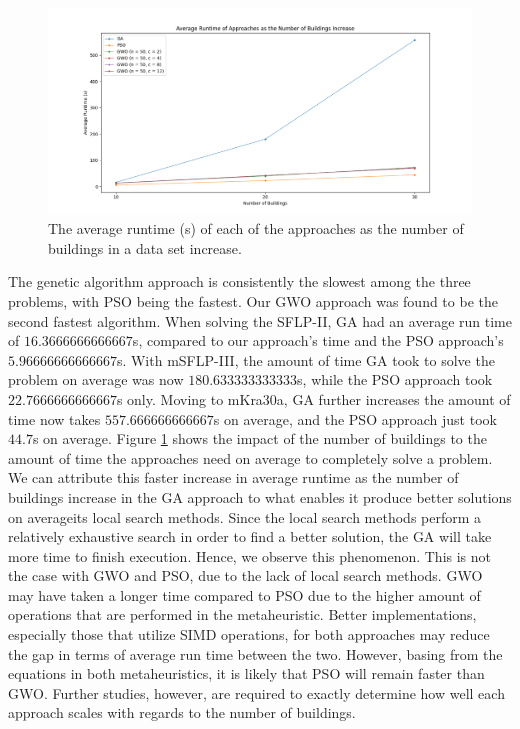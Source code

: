 \begin{figure}[h!]
\centering
\begin{adjustwidth}{-0.45in}{}
\includegraphics[scale=0.5]{./images/chap07-rd/approaches-average-runtime-over-no-of-buildings.png}
\end{adjustwidth}
\caption{The average runtime (s) of each of the approaches as the number of buildings in a data set increase.}
\label{graph-approaches-runtime-no-buildings}
\end{figure}

The genetic algorithm approach is consistently the slowest among the three problems, with PSO being the fastest. Our GWO approach was found to be the second fastest algorithm. When solving the SFLP-II, GA had an average run time of $16.3666666666667$s, compared to our approach's time and the PSO approach's $5.96666666666667$s. With mSFLP-III, the amount of time GA took to solve the problem on average was now $180.633333333333$s, while the PSO approach took $22.7666666666667$s only. Moving to mKra30a, GA further increases the amount of time now takes $557.666666666667$s on average, and the PSO approach just took $44.7$s on average. Figure \ref{graph-approaches-runtime-no-buildings} shows the impact of the number of buildings to the amount of time the approaches need on average to completely solve a problem. We can attribute this faster increase in average runtime as the number of buildings increase in the GA approach to what enables it produce better solutions on average\textemdash its local search methods. Since the local search methods perform a relatively exhaustive search in order to find a better solution, the GA will take more time to finish execution. Hence, we observe this phenomenon. This is not the case with GWO and PSO, due to the lack of local search methods. GWO may have taken a longer time compared to PSO due to the higher amount of operations that are performed in the metaheuristic. Better implementations, especially those that utilize SIMD operations, for both approaches may reduce the gap in terms of average run time between the two. However, basing from the equations in both metaheuristics, it is likely that PSO will remain faster than GWO. Further studies, however, are required to exactly determine how well each approach scales with regards to the number of buildings.

